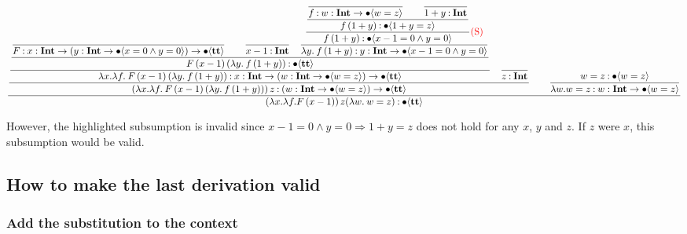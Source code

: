 \documentclass{article}
\begin{document}
\begin{equation*}
    \dfrac{
    \dfrac{
        \dfrac{
            \dfrac{
                    \dfrac{
                    }{
                    F \mathbin{:} {x} : \textbf{Int} \to ({y} : \textbf{Int} \to \bullet \langle x = 0 \wedge y = 0 \rangle) \to \bullet \langle \textbf{tt} \rangle
                    }
                    \qquad
                    \dfrac{}{
                    x - 1 \mathbin{:} \textbf{Int}
                    }
                \quad
                \dfrac{
                    \dfrac{
                        \dfrac{
                            \dfrac{}{
                                f \mathbin{:} {w} : \textbf{Int} \to \bullet \langle w=z \rangle
                            }
                            \qquad
                            \dfrac{}{
                                1+y \mathbin{:} \textbf{Int}
                            }
                        }{
                            f\,(1+y) \mathbin{:} \bullet \langle 1+y=z \rangle
                        }
                    } {
                        f\,(1+y) \mathbin{:} \bullet \langle x - 1 = 0 \wedge y = 0 \rangle
                    }\text{\textcolor{red}{(S)}}
                } {
                    \lambda y.\: f\,(1+y) \mathbin{:} {y} : \textbf{Int} \to \bullet \langle x - 1 = 0 \wedge y = 0 \rangle
                }
            }{
                F\, (x-1)\, (\lambda y.\: f\,(1+y))  \mathbin{:} \bullet \langle \textbf{tt} \rangle
            }
        }{
            \lambda x. \lambda f.\: F\, (x-1)\, (\lambda y.\: f\,(1+y)) \mathbin{:} {x} : \textbf{Int} \to ({w} : \textbf{Int} \to \bullet \langle w =z \rangle) \to \bullet \langle \textbf{tt} \rangle
        }
        \quad
        \dfrac{}{
        z \mathbin{:} \textbf{Int}
        }
        }{
            (\lambda x. \lambda f.\: F\, (x-1)\, (\lambda y.\: f\,(1+y)))\, z \mathbin{:} ({w} : \textbf{Int} \to \bullet \langle w = z \rangle) \to \bullet \langle \textbf{tt} \rangle
        }
        \qquad 
        \dfrac{
            w = z \mathbin{:} \bullet \langle  w = z \rangle
        }{
            \lambda w. w = z \mathbin{:} {w} : \textbf{Int} \to \bullet \langle w = z \rangle
        }
    }{
        (\lambda x. \lambda f. F\, (x-1))\, z (\lambda w.\: w = z) \mathbin{:} \bullet \langle \textbf{tt} \rangle
    }
\end{equation*}

However, the highlighted subsumption is invalid since \( x -1 = 0 \wedge y = 0 \Rightarrow 1 + y = z \) does not hold for any \( x \), \( y \) and \( z \).
If \( z \) were \( x \), this subsumption would be valid.

\subsection{How to make the last derivation valid}

\subsubsection{Add the substitution to the context}
\end{document}
